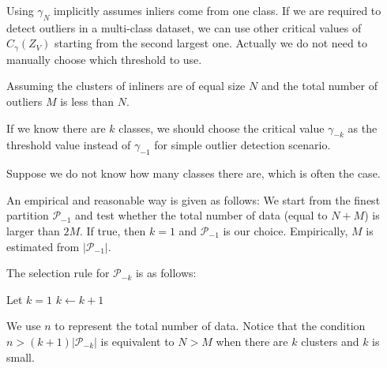 \documentclass{article}
\begin{document}
Using $\gamma_N$ implicitly assumes inliers come from one class.
If we are required to detect outliers in a multi-class dataset, we can use other critical values of $C_{\gamma}(Z_V)$ starting from the second largest one. Actually we do not need to manually choose which threshold to use.

Assuming the clusters of inliners are of equal size $N$ and the total number of
outliers $M$ is less than $N$.

If we know there are $k$ classes, we should choose the critical value $\gamma_{-k}$ as the threshold value instead of $\gamma_{-1}$ for simple outlier detection scenario.

Suppose we do not know how many classes there are, which is often the case.

An empirical and reasonable way is given as follows:
We start from the finest partition $\mathcal{P}_{-1}$ and test whether the total number of data (equal to $N+M$) is larger than $2M$. If true, then $k=1$ and $\mathcal{P}_{-1}$ is our choice.
Empirically, $M$ is estimated from $|\mathcal{P}_{-1}|$.

The selection rule for $\mathcal{P}_{-k}$ is as follows:

\begin{algorithmic}
\STATE Let $k=1$
\STATE $k\leftarrow k+1$
\ENDWHILE
\end{algorithmic}

We use $n$ to represent the total number of data. Notice that the condition $ n > (k+1) |\mathcal{P}_{-k}|$ is equivalent
to $N>M$ when there are $k$ clusters and $k$ is small.
\end{document}
